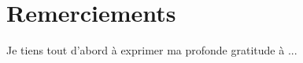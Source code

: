 \chapter*{Remerciements}
\label{sec:Acknowledgements}
\thispagestyle{empty}
Je tiens tout d'abord à exprimer ma profonde gratitude à ...

